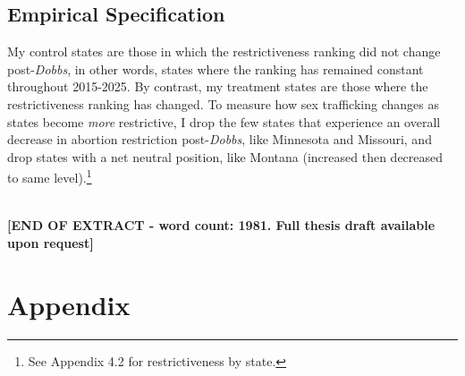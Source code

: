 \documentclass[12pt]{article}
\begin{document}
\subsection{Empirical Specification}
\indent My control states are those in which the restrictiveness ranking did not change post-\textit{Dobbs}, in other words, states where the ranking has remained constant throughout 2015-2025. By contrast, my treatment states are those where the restrictiveness ranking has changed. To measure how sex trafficking changes as states become \textit{more} restrictive, I drop the few states that experience an overall decrease in abortion restriction post-\textit{Dobbs}, like Minnesota and Missouri, and drop states with a net neutral position, like Montana (increased then decreased to same level).\footnote{See Appendix 4.2 for restrictiveness by state.} \\
\\
\centerline{\textbf{[END OF EXTRACT - word count: 1981. Full thesis draft available upon request]}} 

\clearpage
\nocite{*}



\section{Appendix}
\end{document}
